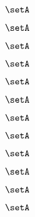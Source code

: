 {\begin{forslides}
        \begin{equation}
            \label{eq:parallelism-172}
            \setA
        \end{equation}

        \begin{equation}
            \label{eq:parallelism-173}
            \setA
        \end{equation}

        \begin{equation}
            \label{eq:parallelism-174}
            \setA
        \end{equation}

        \begin{equation}
            \label{eq:parallelism-175}
            \setA
        \end{equation}

        \begin{equation}
            \label{eq:parallelism-176}
            \setA
        \end{equation}

        \begin{equation}
            \label{eq:parallelism-177}
            \setA
        \end{equation}

        \begin{equation}
            \label{eq:parallelism-178}
            \setA
        \end{equation}

        \begin{equation}
            \label{eq:parallelism-179}
            \setA
        \end{equation}

        \begin{equation}
            \label{eq:parallelism-180}
            \setA
        \end{equation}

        \begin{equation}
            \label{eq:parallelism-181}
            \setA
        \end{equation}

        \begin{equation}
            \label{eq:parallelism-182}
            \setA
        \end{equation}

        \begin{equation}
            \label{eq:parallelism-183}
            \setA
        \end{equation}


\end{forslides}}
